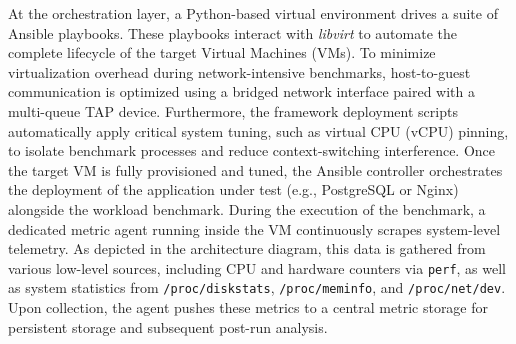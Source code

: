 At the orchestration layer, a Python-based virtual environment drives a suite of Ansible playbooks.
These playbooks interact with \textit{libvirt} to automate the complete lifecycle of the target Virtual Machines (VMs).
To minimize virtualization overhead during network-intensive benchmarks, host-to-guest communication is optimized using a bridged network interface paired with a multi-queue TAP device.
Furthermore, the framework deployment scripts automatically apply critical system tuning, such as virtual CPU (vCPU) pinning, to isolate benchmark processes and reduce context-switching interference.
Once the target VM is fully provisioned and tuned, the Ansible controller orchestrates the deployment of the application under test (e.g., PostgreSQL or Nginx) alongside the workload benchmark.
During the execution of the benchmark, a dedicated metric agent running inside the VM continuously scrapes system-level telemetry.
As depicted in the architecture diagram, this data is gathered from various low-level sources, including CPU and hardware counters via \texttt{perf}, as well as system statistics from \texttt{/proc/diskstats}, \texttt{/proc/meminfo}, and \texttt{/proc/net/dev}.
Upon collection, the agent pushes these metrics to a central metric storage for persistent storage and subsequent post-run analysis.

